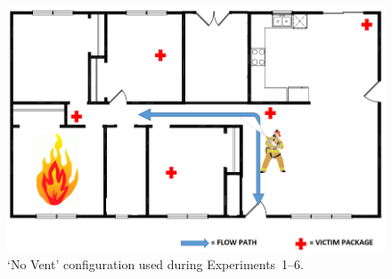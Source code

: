 \documentclass[12pt,oneside]{book}
\begin{document}
\begin{figure}[!ht]
	\centering
	\includegraphics[width=5in]{Figures/General/No_Vent_interior_config}
	\caption{`No Vent' configuration used during Experiments~1--6.}
	\label{fig:No_Vent_int}
\end{figure}
\end{document}

